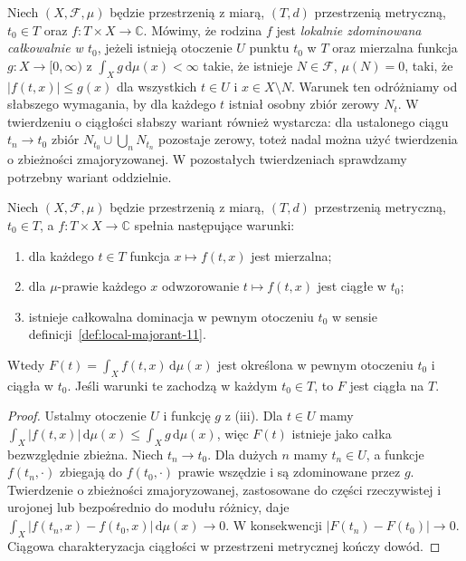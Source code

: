 \begin{definicja}
\label{def:local-majorant-11}
Niech $(X,\mathcal F,\mu)$ będzie przestrzenią z miarą,
$(T,d)$ przestrzenią metryczną, $t_0\in T$ oraz
$f:T\times X\to\mathbb C$. Mówimy, że rodzina $f$ jest
\emph{lokalnie zdominowana całkowalnie w $t_0$}, jeżeli istnieją
otoczenie $U$ punktu $t_0$ w $T$ oraz mierzalna funkcja
$g:X\to[0,\infty)$ z $\int_Xg\,\mathrm d\mu(x)<\infty$ takie, że
istnieje $N\in\mathcal F$, $\mu(N)=0$, taki, że
$|f(t,x)|\le g(x)$ dla wszystkich $t\in U$ i $x\in X\setminus N$.
Warunek ten odróżniamy od słabszego wymagania, by dla każdego $t$
istniał osobny zbiór zerowy $N_t$. W twierdzeniu o ciągłości
słabszy wariant również wystarcza: dla ustalonego ciągu
$t_n\to t_0$ zbiór $N_{t_0}\cup\bigcup_n N_{t_n}$
pozostaje zerowy, toteż nadal można użyć twierdzenia
o zbieżności zmajoryzowanej. W pozostałych twierdzeniach
sprawdzamy potrzebny wariant oddzielnie.
\end{definicja}

\begin{twierdzenie}
\label{thm:local-continuity-11}
Niech $(X,\mathcal F,\mu)$ będzie przestrzenią z miarą,
$(T,d)$ przestrzenią metryczną, $t_0\in T$,
a $f:T\times X\to\mathbb C$ spełnia następujące warunki:
\begin{enumerate}[label=\textup{(\roman*)}]
\item dla każdego $t\in T$ funkcja $x\mapsto f(t,x)$ jest mierzalna;
\item dla $\mu$-prawie każdego $x$ odwzorowanie $t\mapsto f(t,x)$
      jest ciągłe w $t_0$;
\item istnieje całkowalna dominacja w pewnym otoczeniu $t_0$
      w sensie definicji~\ref{def:local-majorant-11}.
\end{enumerate}
Wtedy $F(t)=\int_X f(t,x)\,\mathrm d\mu(x)$ jest określona
w pewnym otoczeniu $t_0$ i ciągła w $t_0$.
Jeśli warunki te zachodzą w każdym $t_0\in T$, to $F$ jest
ciągła na $T$.
\end{twierdzenie}
\begin{proof}
Ustalmy otoczenie $U$ i funkcję $g$ z (iii). Dla $t\in U$
mamy $\int_X|f(t,x)|\,\mathrm d\mu(x)\le\int_Xg\,\mathrm d\mu(x)$,
więc $F(t)$ istnieje jako całka bezwzględnie zbieżna. Niech
$t_n\to t_0$. Dla dużych $n$ mamy $t_n\in U$, a funkcje
$f(t_n,\cdot)$ zbiegają do $f(t_0,\cdot)$ prawie wszędzie i
są zdominowane przez $g$. Twierdzenie o zbieżności zmajoryzowanej,
zastosowane do części rzeczywistej i urojonej lub bezpośrednio
do modułu różnicy, daje
$\int_X |f(t_n,x)-f(t_0,x)|\,\mathrm d\mu(x)\to0$.
W konsekwencji $|F(t_n)-F(t_0)|\to0$. Ciągowa charakteryzacja
ciągłości w przestrzeni metrycznej kończy dowód.
\end{proof}

